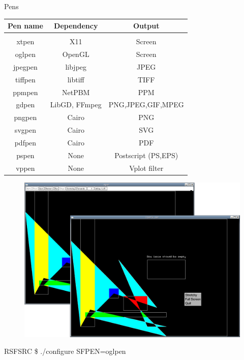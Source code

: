 \begin{frame}
  \begin{block}{Pens}
  \begin{table}
    \begin{center}
     \begin{tabular}{|c|c|c|}
      \hline    Pen name   &  Dependency   &    Output          \\
      \hline & & \\[-1em]
      \hline     xtpen     &     X11       &     Screen         \\
      \hline     oglpen    &   OpenGL      &     Screen         \\
      \hline     jpegpen   &   libjpeg     &     JPEG           \\
      \hline     tiffpen   &   libtiff     &     TIFF           \\
      \hline     ppmpen    &   NetPBM      &     PPM            \\
      \hline     gdpen     & LibGD, FFmpeg &  PNG,JPEG,GIF,MPEG \\
      \hline     pngpen    &   Cairo       &      PNG           \\
      \hline     svgpen    &   Cairo       &      SVG           \\
      \hline     pdfpen    &   Cairo       &      PDF           \\
      \hline     pspen     &    None       &   Postscript (PS,EPS)      \\
      \hline     vppen     &    None       &   Vplot filter     \\
      \hline
    \end{tabular}
   \end{center}
  \end{table}
  \end{block}
\end{frame}

\begin{frame}
  \begin{figure}
  \includegraphics[scale=0.3]{Fig/xtglpens.pdf}
  \end{figure}
  \begin{block}{}
   RSFSRC \$ ./configure SFPEN=oglpen
  \end{block}
\end{frame}

